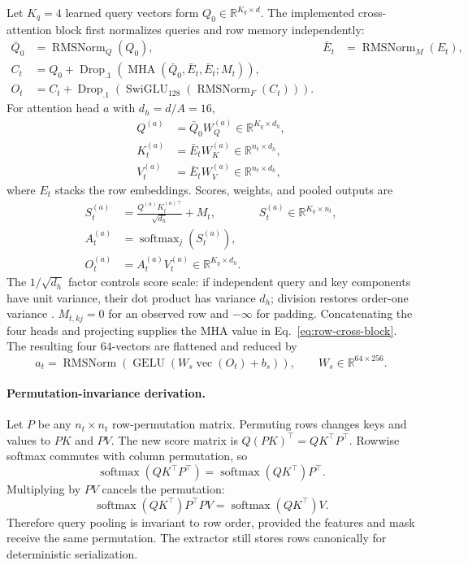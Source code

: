 \documentclass[10pt]{article}
\newcommand{\R}{\mathbb{R}}
\newcommand{\RMSNorm}{\operatorname{RMSNorm}}
\newcommand{\MHA}{\operatorname{MHA}}
\begin{document}
Let $K_q=4$ learned query vectors form $Q_0\in\R^{K_q\times d}$. The implemented cross-attention
block first normalizes queries and row memory independently:
\begin{align}
\bar Q_0&=\RMSNorm_Q(Q_0),& \bar E_t&=\RMSNorm_M(E_t),\\
C_t&=Q_0+\operatorname{Drop}_{.1}\!\left(\MHA(\bar Q_0,\bar E_t,\bar E_t;M_t)\right),\\
O_t&=C_t+\operatorname{Drop}_{.1}\!\left(
\operatorname{SwiGLU}_{128}(\RMSNorm_F(C_t))\right).
\label{eq:row-cross-block}
\end{align}
For attention head $a$ with $d_h=d/A=16$,
\begin{align}
Q^{(a)}&=\bar Q_0W_Q^{(a)}\in\R^{K_q\times d_h},\\
K_t^{(a)}&=\bar E_tW_K^{(a)}\in\R^{n_t\times d_h},\\
V_t^{(a)}&=\bar E_tW_V^{(a)}\in\R^{n_t\times d_h},
\end{align}
where $E_t$ stacks the row embeddings. Scores, weights, and pooled outputs are
\begin{align}
S_t^{(a)}&=\frac{Q^{(a)}K_t^{(a)\top}}{\sqrt{d_h}}+M_t,
&&S_t^{(a)}\in\R^{K_q\times n_t},\\
A_t^{(a)}&=\operatorname{softmax}_{j}\!\left(S_t^{(a)}\right),\\
O_t^{(a)}&=A_t^{(a)}V_t^{(a)}\in\R^{K_q\times d_h}.
\label{eq:row-attention}
\end{align}
The $1/\sqrt{d_h}$ factor controls score scale: if independent query and key components have unit
variance, their dot product has variance $d_h$; division restores order-one variance
\citep{vaswani2017attention}. $M_{t,kj}=0$ for an observed row and $-\infty$ for padding. Concatenating
the four heads and projecting supplies the MHA value in Eq.~\eqref{eq:row-cross-block}. The resulting
four $64$-vectors are flattened and reduced by
\begin{equation}
a_t=\RMSNorm\!\left(\operatorname{GELU}(W_s\operatorname{vec}(O_t)+b_s)\right),
\qquad W_s\in\R^{64\times256}.
\label{eq:row-summary}
\end{equation}

\paragraph{Permutation-invariance derivation.}
Let $P$ be any $n_t\times n_t$ row-permutation matrix. Permuting rows changes keys and values to
$PK$ and $PV$. The new score matrix is $Q(PK)^\top=QK^\top P^\top$. Rowwise softmax commutes with
column permutation, so
\begin{equation}
\operatorname{softmax}(QK^\top P^\top)=\operatorname{softmax}(QK^\top)P^\top.
\end{equation}
Multiplying by $PV$ cancels the permutation:
\begin{equation}
\operatorname{softmax}(QK^\top)P^\top PV
=\operatorname{softmax}(QK^\top)V.
\end{equation}
Therefore query pooling is invariant to row order, provided the features and mask receive the same
permutation. The extractor still stores rows canonically for deterministic serialization.
\end{document}
